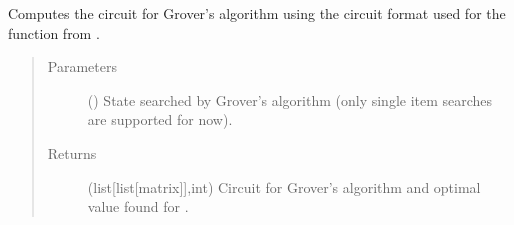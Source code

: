 \documentclass[letterpaper,10pt,english]{sphinxmanual}
\begin{document}
\begin{fulllineitems}
\label{\detokenize{grover:grover.grover_layers_kopt}}
Computes the circuit for Grover’s algorithm using the circuit format used for 
the  function from .
\begin{quote}\begin{description}
\item[{Parameters}] \leavevmode
{} (\sphinxstyleliteralemphasis{\sphinxupquote{{[}}}\sphinxstyleliteralemphasis{\sphinxupquote{{]}}}) \textendash{} State searched by Grover’s algorithm 
(only single item searches are supported for now).

\item[{Returns}] \leavevmode
(list{[}list{[}matrix{]}{]},int) \textendash{} Circuit for Grover’s algorithm and 
optimal value found for .

\end{description}\end{quote}

\end{fulllineitems}

\end{document}
